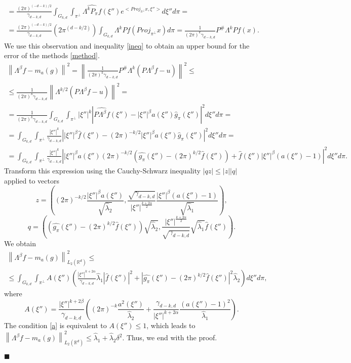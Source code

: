 \documentclass[12pt]{iopart}
\newenvironment{proof}
{\par\noindent{\bf Proof}}
{\hfill$\scriptstyle\blacksquare$}
\begin{document}
\begin{proof}
\begin{multline*}
    = \frac{(2\pi)^{(-d-k)/2}}{\gamma_{d-k,d}}\int_{G_{k,d}}\int_{\pi^\perp}\widehat{\Lambda^kP_\pi f}(\xi'')e^{<Proj_{\pi^\perp}x,\xi''>}d\xi''d\pi = \\
    = \frac{(2\pi)^{(-d-k)/2}}{\gamma_{d-k,d}}(2\pi^{(d-k/2)})\int_{G_{k,d}}\Lambda^kP f(Proj_{\pi^\perp}x)d\pi = \frac{1}{(2\pi)^k\gamma_{d-k,d}}P^\#\Lambda^kPf(x).
    \end{multline*}
We use this observation and inequality \eqref{ineq} to obtain an upper bound for the error of the methods \eqref{method}.
    \begin{multline*}
    \left\|\Lambda^\beta f-m_a(g)\right\|^2=\left\|\frac{1}{(2\pi)^k\gamma_{d-k,d}}P^\#\Lambda^k(P\Lambda^\beta f-u)\right\|^2\leqslant\\
    \leqslant\frac{1}{(2\pi)^k\gamma_{d-k,d}}\left\|\Lambda^{k/2}(P\Lambda^\beta f-u)\right\|^2=\\
    =\frac{1}{(2\pi)^k\gamma_{d-k,d}}\int_{G_{k,d}}\int_{\pi^\perp}|\xi''|^k\left|\widehat{P\Lambda^\beta f}(\xi'')-|\xi''|^\beta a(\xi'')\widehat g_\pi(\xi'')\right|^2d\xi'' d\pi=\\
    =\int_{G_{k,d}}\int_{\pi^\perp}\frac{|\xi''|^k}{\gamma_{d-k,d}}\left||\xi''|^\beta\widehat{f}(\xi'')-(2\pi)^{-k/2}|\xi''|^\beta a(\xi'')\widehat g_\pi(\xi'')\right|^2d\xi'' d\pi=\\
    =\int_{G_{k,d}}\int_{\pi^\perp}\frac{|\xi''|^k}{\gamma_{d-k,d}}\left||\xi''|^\beta a(\xi'')(2\pi)^{-k/2}\left(\widehat{g_\pi }(\xi'')-(2\pi)^{k/2}\widehat f(\xi'' )\right)+\widehat f(\xi'')|\xi''|^\beta\left(a(\xi'')-1\right)\right|^2d\xi''d\pi .
    \end{multline*}
Transform this expression using the Cauchy-Schwarz inequality $|qz|\leqslant |z||q|$ applied to vectors
    \[
    z=\left((2\pi)^{-k/2}\frac{|\xi''|^\beta a(\xi'')}{\sqrt{\widehat\lambda_2}},\frac{\sqrt{\gamma_{d-k,d}}}{|\xi''|^{\frac{k+2\alpha}{2}}}\frac{|\xi''|^\beta(a(\xi'')-1)}{\sqrt{\widehat\lambda_1}}\right),
    \]
    \[
    q=\left(\left(\widehat{g_\pi }(\xi'')-(2\pi)^{k/2}\widehat
    f(\xi'' )\right)\sqrt{\widehat\lambda_2},\frac{|\xi''|^{\frac{k+2\alpha}{2}}}{\sqrt{\gamma_{d-k,d}}}\sqrt{\widehat\lambda_1}\widehat f(\xi'' )\right).
    \]
We obtain
    \begin{multline*}  
    \left\|\Lambda^\beta f-m_a(g)\right\|^2_{L_2(\mathbb R^d)}\leqslant  \\
    \leqslant \int_{G_{k,d}}\int_{\pi^\perp}
    A(\xi'')\left(\frac{|\xi''|^{k+2\alpha}}{\gamma_{d-k,d}}\widehat\lambda_1|\widehat f(\xi'')|^2+\left|\widehat{g_\pi}(\xi'')-(2\pi)^{k/2}\widehat f(\xi'')\right|^2\widehat\lambda_2\right)d\xi''d\pi,
    \end{multline*}
where
  \[
  A(\xi'')=\frac{|\xi''|^{k+2\beta}}{\gamma_{d-k,d}}\left((2\pi)^{-k}\frac{a^2(\xi'')}{\widehat\lambda_2}+\frac{\gamma_{d-k,d}}{|\xi''|^{k+2\alpha}}\frac{(a(\xi'')-1)^2}{\widehat\lambda_1}\right).
  \]
  The condition \eqref{a} is equivalent to $A(\xi'')\leqslant 1$, which leads to $\left\|\Lambda^\beta f-m_a(g)\right\|^2_{L_2(\mathbb R^d)}\leqslant
  \widehat\lambda_1+\widehat\lambda_2\delta^2.$
Thus, we end with the proof.

\end{proof}
\end{document}
